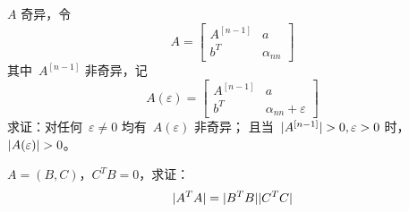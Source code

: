 \documentclass[twoside,openright]{book}
\begin{document}
\begin{CJK*}{UTF8}{}
\begin{quest}
\label{quest:75}
$A$ 奇异，令
\[
A=
\begin{bmatrix}
A^{[n-1]} & a \\
b^T       & \alpha_{nn}
\end{bmatrix}
\]
其中\ $A^{[n-1]}$ 非奇异，记
\[
A(\varepsilon)=
\begin{bmatrix}
A^{[n-1]} & a \\
b^T       & \alpha_{nn}+\varepsilon
\end{bmatrix}
\]
求证：对任何\ $\varepsilon\neq0$ 均有\ $A(\varepsilon)$ 非奇异；
且当\ $\lvert{A^{[n-1]}}\rvert>0,\varepsilon>0$ 时，$\lvert{A(\varepsilon)}\rvert>0$。
\end{quest}

\begin{quest}
\label{quest:76}
$A=(B,C)$，$C^TB=0$，求证：
\[
\lvert{A^TA}\rvert=\lvert{B^TB}\rvert\lvert{C^TC}\rvert
\]
\end{quest}


\end{CJK*}
\end{document}
